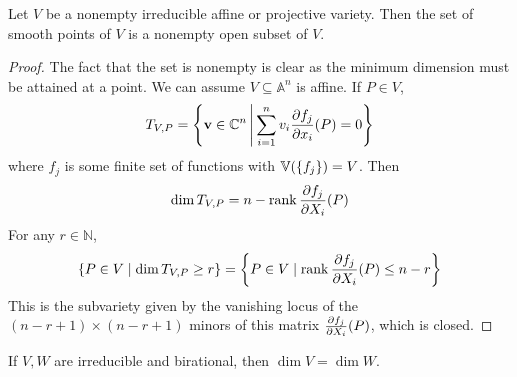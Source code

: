 \begin{theorem}
    Let \( V \) be a nonempty irreducible affine or projective variety.
    Then the set of smooth points of \( V \) is a nonempty open subset of \( V \).
\end{theorem}
\begin{proof}
    The fact that the set is nonempty is clear as the minimum dimension must be attained at a point.
    We can assume \( V \subseteq \mathbb A^n \) is affine.
    If \( P \in V \),
    \[ T_{V,P} = \qty{\vb v \in \mathbb C^n \,\middle|\,\sum_{i=1}^n v_i \pdv{f_j}{x_i}\qty(P) = 0} \]
    where \( f_j \) is some finite set of functions with \( \mathbb V(\qty{f_j}) = V \).
    Then
    \[ \dim T_{V,P} = n - \rank \pdv{f_j}{X_i}\qty(P) \]
    For any \( r \in \mathbb N \),
    \[ \qty{P \in V \mid \dim T_{V,P} \geq r} = \qty{P \in V \mid \rank \pdv{f_j}{X_i}\qty(P) \leq n - r} \]
    This is the subvariety given by the vanishing locus of the \( (n-r+1) \times (n-r+1) \) minors of this matrix \( \pdv{f_j}{X_i}\qty(P) \), which is closed.
\end{proof}
\begin{corollary}
    If \( V, W \) are irreducible and birational, then \( \dim V = \dim W \).
\end{corollary}
